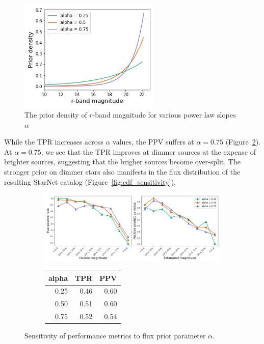 \begin{figure}[!h]
    \centering
    \includegraphics[width = 0.6\textwidth]{figures/prior_sensitivity/prior_fluxes.png}
    \caption{The prior density of $r$-band magnitude for various power law slopes $\alpha$}
    \label{fig:flux_priors}
\end{figure}

While the TPR increases across $\alpha$ values, the PPV suffers at $\alpha = 0.75$ (Figure~\ref{fig:alpha_sensitivity}).
At $\alpha = 0.75$, we see that the TPR improves at dimmer sources at the expense of brighter sources, suggesting that the brigher sources become over-split. 
The stronger prior on dimmer stars also manifests in the flux distribution of the resulting StarNet catalog (Figure~\ref{fig:cdf_sensitivity}). 

\begin{figure}[ht]
\begin{subfigure}{\textwidth}
\centering
\includegraphics[width = \textwidth]{figures/prior_sensitivity/prior_alpha_sensitivity.png}
\end{subfigure}
\begin{subfigure}{\textwidth}
\begin{center}
\begin{tabular}{rrr}
\toprule
 alpha &   TPR &   PPV \\
\midrule
  0.25 &  0.46 &  0.60 \\
  0.50 &  0.51 &  0.60 \\
  0.75 &  0.52 &  0.54 \\
\bottomrule
\end{tabular}
\par\vspace{0pt}
\end{center}
\end{subfigure}\hfill
\caption{Sensitivity of performance metrics to flux prior parameter $\alpha$. }
\label{fig:alpha_sensitivity}
\end{figure}

